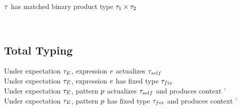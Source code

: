 \documentclass{article}
\begin{document}
 $\TMV$ has matched binary product type $\TProd{\TMV_1}{\TMV_2}$
%
\begin{mathpar}


\end{mathpar} \\

\newpage


\subsection{Total Typing}
 Under expectation $\TMV_{E}$, expression $\EMV$ actualizes $\TMV_{self}$
\\
 Under expectation $\TMV_{E}$, expression $\EMV$ has fixed type $\TMV_{fix}$
\\
 Under expectation $\TMV_{E}$, pattern $\PMV$ actualizes $\TMV_{self}$ and produces context {\ctx'}
\\
 Under expectation $\TMV_{E}$, pattern $\PMV$ has fixed type $\TMV_{fix}$ and produces context {\ctx'}
%
\end{document}
